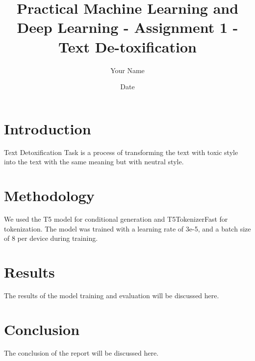 \documentclass{article}
\title{Practical Machine Learning and Deep Learning - Assignment 1 - Text De-toxification}
\author{Your Name}
\date{Date}
\begin{document}
\maketitle

\section{Introduction}
Text Detoxification Task is a process of transforming the text with toxic style into the text with the same meaning but with neutral style.

\section{Methodology}
We used the T5 model for conditional generation and T5TokenizerFast for tokenization. The model was trained with a learning rate of 3e-5, and a batch size of 8 per device during training.

\section{Results}
The results of the model training and evaluation will be discussed here.

\section{Conclusion}
The conclusion of the report will be discussed here.
\end{document}
